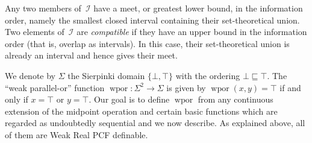\documentclass[12pt]{article}
\newcommand{\wpor}{\operatorname{wpor}}
\newcommand{\I}{\mathcal{I}}
\begin{document}
Any two members of~$\I$ have a meet, or greatest lower bound, in the
information order, namely the smallest closed interval containing
their set-theoretical union.  Two elements of~$\I$ are
\emph{compatible} if they have an upper bound in the information order
(that is, overlap as intervals).  In this case, their set-theoretical
union is already an interval and hence gives their meet.

We denote by $\Sigma$ the Sierpinki domain $\{\bot,\top\}$ with the
ordering $\bot\sqsubseteq\top$.  The ``weak parallel-or'' function
$\wpor:\Sigma^2 \to\Sigma$ is given by $\wpor(x,y)=\top$ if and only
if $x=\top$ or $y=\top$.  Our goal is to define $\wpor$ from any
continuous extension of the midpoint operation and certain basic
functions which are regarded as undoubtedly sequential and we now
describe. As explained above, all of them are Weak Real PCF definable.
\end{document}
